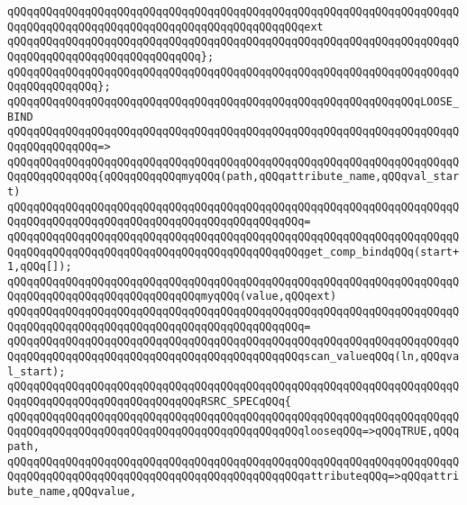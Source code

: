 \verb|qQQqqQQqqQQqqQQqqQQqqQQqqQQqqQQqqQQqqQQqqQQqqQQqqQQqqQQqqQQqqQQqqQQqqQQqqQQqqQQqqQQqqQQqqQQqqQQqqQQqqQQqqQQqqQQqqQQqext|\newline
\verb|qQQqqQQqqQQqqQQqqQQqqQQqqQQqqQQqqQQqqQQqqQQqqQQqqQQqqQQqqQQqqQQqqQQqqQQqqQQqqQQqqQQqqQQqqQQqqQQqqQQq};|\newline
\verb|qQQqqQQqqQQqqQQqqQQqqQQqqQQqqQQqqQQqqQQqqQQqqQQqqQQqqQQqqQQqqQQqqQQqqQQqqQQqqQQqqQQq};|\newline
\newline
\verb|qQQqqQQqqQQqqQQqqQQqqQQqqQQqqQQqqQQqqQQqqQQqqQQqqQQqqQQqqQQqqQQqLOOSE_BIND|\newline
\verb|qQQqqQQqqQQqqQQqqQQqqQQqqQQqqQQqqQQqqQQqqQQqqQQqqQQqqQQqqQQqqQQqqQQqqQQqqQQqqQQqqQQq=>|\newline
\verb|qQQqqQQqqQQqqQQqqQQqqQQqqQQqqQQqqQQqqQQqqQQqqQQqqQQqqQQqqQQqqQQqqQQqqQQqqQQqqQQqqQQq{qQQqqQQqqQQqmyqQQq(path,qQQqattribute_name,qQQqval_start)|\newline
\verb|qQQqqQQqqQQqqQQqqQQqqQQqqQQqqQQqqQQqqQQqqQQqqQQqqQQqqQQqqQQqqQQqqQQqqQQqqQQqqQQqqQQqqQQqqQQqqQQqqQQqqQQqqQQqqQQqqQQq=|\newline
\verb|qQQqqQQqqQQqqQQqqQQqqQQqqQQqqQQqqQQqqQQqqQQqqQQqqQQqqQQqqQQqqQQqqQQqqQQqqQQqqQQqqQQqqQQqqQQqqQQqqQQqqQQqqQQqqQQqqQQqget_comp_bindqQQq(start+1,qQQq[]);|\newline
\newline
\verb|qQQqqQQqqQQqqQQqqQQqqQQqqQQqqQQqqQQqqQQqqQQqqQQqqQQqqQQqqQQqqQQqqQQqqQQqqQQqqQQqqQQqqQQqqQQqqQQqqQQqmyqQQq(value,qQQqext)|\newline
\verb|qQQqqQQqqQQqqQQqqQQqqQQqqQQqqQQqqQQqqQQqqQQqqQQqqQQqqQQqqQQqqQQqqQQqqQQqqQQqqQQqqQQqqQQqqQQqqQQqqQQqqQQqqQQqqQQqqQQq=|\newline
\verb|qQQqqQQqqQQqqQQqqQQqqQQqqQQqqQQqqQQqqQQqqQQqqQQqqQQqqQQqqQQqqQQqqQQqqQQqqQQqqQQqqQQqqQQqqQQqqQQqqQQqqQQqqQQqqQQqqQQqscan_valueqQQq(ln,qQQqval_start);|\newline
\newline
\verb|qQQqqQQqqQQqqQQqqQQqqQQqqQQqqQQqqQQqqQQqqQQqqQQqqQQqqQQqqQQqqQQqqQQqqQQqqQQqqQQqqQQqqQQqqQQqqQQqqQQqRSRC_SPECqQQq{|\newline
\verb|qQQqqQQqqQQqqQQqqQQqqQQqqQQqqQQqqQQqqQQqqQQqqQQqqQQqqQQqqQQqqQQqqQQqqQQqqQQqqQQqqQQqqQQqqQQqqQQqqQQqqQQqqQQqqQQqqQQqlooseqQQq=>qQQqTRUE,qQQqpath,|\newline
\verb|qQQqqQQqqQQqqQQqqQQqqQQqqQQqqQQqqQQqqQQqqQQqqQQqqQQqqQQqqQQqqQQqqQQqqQQqqQQqqQQqqQQqqQQqqQQqqQQqqQQqqQQqqQQqqQQqqQQqattributeqQQq=>qQQqattribute_name,qQQqvalue,|\newline
